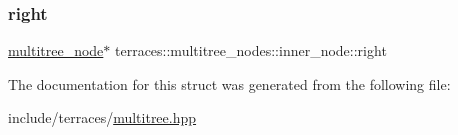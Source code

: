 \subsubsection{\texorpdfstring{right}{right}}
{\footnotesize\ttfamily \hyperlink{structterraces_1_1multitree__node}{multitree\+\_\+node}$\ast$ terraces\+::multitree\+\_\+nodes\+::inner\+\_\+node\+::right}



The documentation for this struct was generated from the following file\+:\begin{DoxyCompactItemize}
\item 
include/terraces/\hyperlink{multitree_8hpp}{multitree.\+hpp}\end{DoxyCompactItemize}
